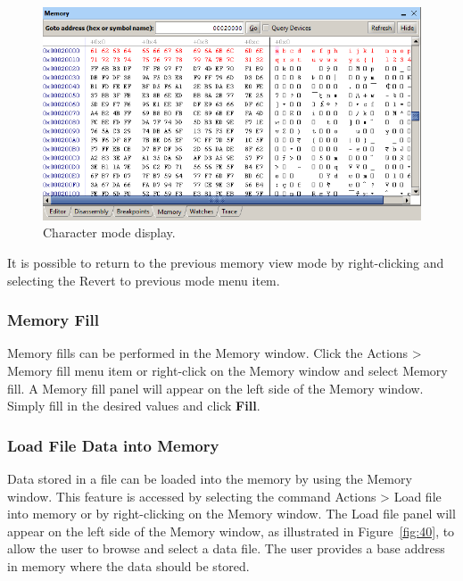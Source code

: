 \documentclass[11pt, twoside, pdftex]{article}
\begin{document}
\begin{figure}[H]
   \begin{center}
      \includegraphics[scale=0.7]{screenshots/figure39.png}
   \end{center}
   \caption{Character mode display.}
	 \label{fig:39}
\end{figure}

It is possible to return to the previous memory view mode by
right-clicking and selecting the {\sf Revert to previous mode}
menu item.

\subsubsection{Memory Fill}
\label{sec:9.2.2}

Memory fills can be performed in the Memory window. Click the
{\sf Actions > Memory fill} menu item or right-click on the
Memory window and select {\sf Memory fill}. 
A {\sf Memory fill} panel will appear on the left side of the
Memory window. Simply fill in the desired values and 
click {\bf Fill}. 

\subsubsection{Load File Data into Memory}
\label{sec:9.2.3}

Data stored in a file can be loaded into the memory by using the
Memory window. This feature is accessed by selecting the command
{\sf Actions > Load file into memory} or by right-clicking on the
Memory window. The {\sf Load file} panel will appear on the left
side of the Memory window, as illustrated in Figure~\ref{fig:40}, to allow
the user to browse and select a data file.  The user provides a base address in memory where the data should be stored. 
\end{document}
